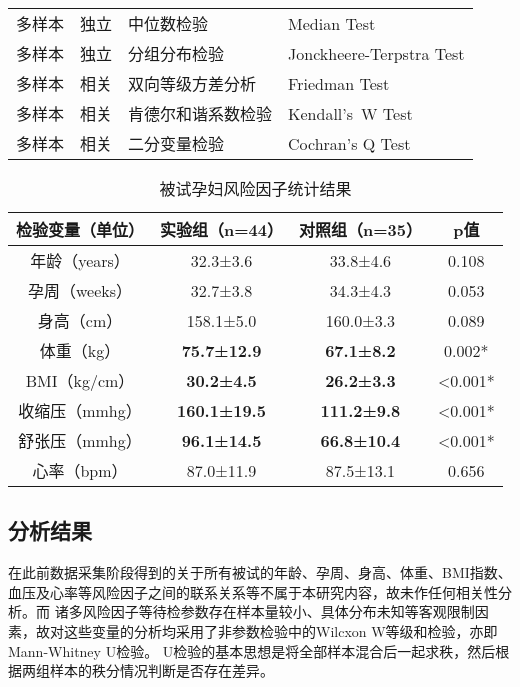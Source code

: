 \begin{center}
\begin{longtable}{m{1.8cm}<{\centering}m{2.5cm}<{\centering}m{5cm}<{\centering}m{6cm}<{\centering}}
            多样本   & 独立    & 中位数检验 & Median Test \\
            多样本   & 独立    & 分组分布检验 & Jonckheere-Terpstra Test \\
            多样本   & 相关    & 双向等级方差分析 & Friedman Test \\
            多样本   & 相关    & 肯德尔和谐系数检验 & Kendall's W Test \\
            多样本   & 相关    & 二分变量检验 & Cochran's Q Test \\
      \end{longtable}
\end{center}

\begin{table}[htbp]
      \centering
      \caption{\label{tab:factors_res}被试孕妇风险因子统计结果}
      \begin{tabular}{cccc}
      \toprule
      \textbf{检验变量（单位）}      & \textbf{实验组（n=44）} & \textbf{对照组（n=35）} & \textbf{p值} \\
      \midrule
      年龄（years） & 32.3±3.6 & 33.8±4.6 & 0.108 \\
      孕周（weeks） & 32.7±3.8 & 34.3±4.3 & 0.053 \\
      身高（cm） & 158.1±5.0 & 160.0±3.3 & 0.089 \\
      体重（kg） & \textbf{75.7±12.9} & \textbf{67.1±8.2} & 0.002* \\
      BMI（kg/cm） & \textbf{30.2±4.5} & \textbf{26.2±3.3} & <0.001* \\
      收缩压（mmhg） & \textbf{160.1±19.5} & \textbf{111.2±9.8} & <0.001* \\
      舒张压（mmhg） & \textbf{96.1±14.5} & \textbf{66.8±10.4} & <0.001* \\
      心率（bpm） & 87.0±11.9 & 87.5±13.1 & 0.656 \\
      \bottomrule
      \end{tabular}%
\end{table}%
\subsection{分析结果}
在此前数据采集阶段得到的关于所有被试的年龄、孕周、身高、体重、BMI指数、血压及心率等风险因子之间的联系关系等不属于本研究内容，故未作任何相关性分析。而
诸多风险因子等待检参数存在样本量较小、具体分布未知等客观限制因素，故对这些变量的分析均采用了非参数检验中的Wilcxon W等级和检验，亦即Mann-Whitney U检验。
U检验的基本思想是将全部样本混合后一起求秩，然后根据两组样本的秩分情况判断是否存在差异。

